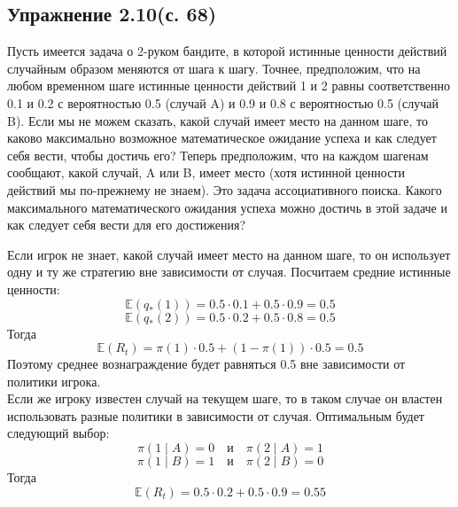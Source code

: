 \subsection{Упражнение 2.10(с. 68)}
Пусть имеется задача о 2-руком бандите, в которой истинные ценности действий случайным образом меняются от шага к шагу. Точнее, предположим, что на любом временном шаге истинные ценности действий 1 и 2 равны соответственно 0.1 и 0.2 с вероятностью 0.5 (случай A) и 0.9 и 0.8 с вероятностью 0.5 (случай B). Если мы не можем сказать, какой случай имеет место на данном шаге, то каково максимально возможное математическое ожидание успеха и как следует себя вести, чтобы достичь его? Теперь предположим, что на каждом шагенам сообщают, какой случай, A или B, имеет место (хотя истинной ценности действий мы по-прежнему не знаем). Это задача ассоциативного поиска. Какого максимального математического ожидания успеха можно достичь в этой задаче и как следует себя вести для его достижения?
\begin{solution}
    Если игрок не знает, какой случай имеет место на данном шаге, то он использует одну и ту же стратегию вне зависимости от случая. Посчитаем средние истинные ценности:
    \[\mathbb{E}(q_*(1)) = 0.5 \cdot 0.1 + 0.5 \cdot 0.9 = 0.5\]
    \[\mathbb{E}(q_*(2)) = 0.5 \cdot 0.2 + 0.5 \cdot 0.8 = 0.5\]
    Тогда 
    \[\mathbb{E}(R_t) = \pi(1) \cdot 0.5 + (1 - \pi(1)) \cdot 0.5 = 0.5\]
    Поэтому среднее вознаграждение будет равняться 0.5 вне зависимости от политики игрока. \\
    Если же игроку известен случай на текущем шаге, то в таком случае он властен использовать разные политики в зависимости от случая. Оптимальным будет следующий выбор:
    \[\pi(1 \mid A) = 0 \quad \text{и} \quad \pi(2 \mid A) = 1\]
    \[\pi(1 \mid B) = 1 \quad \text{и} \quad \pi(2 \mid B) = 0\]
    Тогда 
    \[\mathbb{E}(R_t) = 0.5 \cdot 0.2 + 0.5 \cdot 0.9 = 0.55\]
\end{solution}

